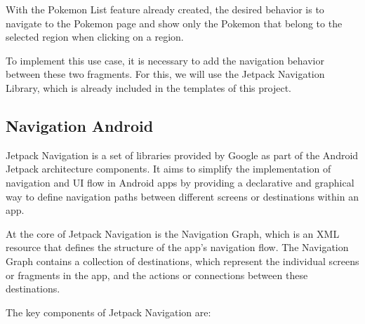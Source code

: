 \documentclass[a4paper, 12pt]{article}
\begin{document}
With the Pokemon List feature already created, the desired behavior is to navigate to the Pokemon page and show only the Pokemon that belong to the selected region when clicking on a region.

To implement this use case, it is necessary to add the navigation behavior between these two fragments. 
For this, we will use the Jetpack Navigation Library, which is already included in the templates of this project.

\subsection{Navigation Android}

Jetpack Navigation is a set of libraries provided by Google as part of the Android Jetpack architecture components.
It aims to simplify the implementation of navigation and UI flow in Android apps by providing a declarative and graphical way to define navigation paths between different screens or destinations within an app.

At the core of Jetpack Navigation is the Navigation Graph, which is an XML resource that defines the structure of the app's navigation flow. 
The Navigation Graph contains a collection of destinations, which represent the individual screens or fragments in the app, and the actions or connections between these destinations.

The key components of Jetpack Navigation are:
\end{document}
